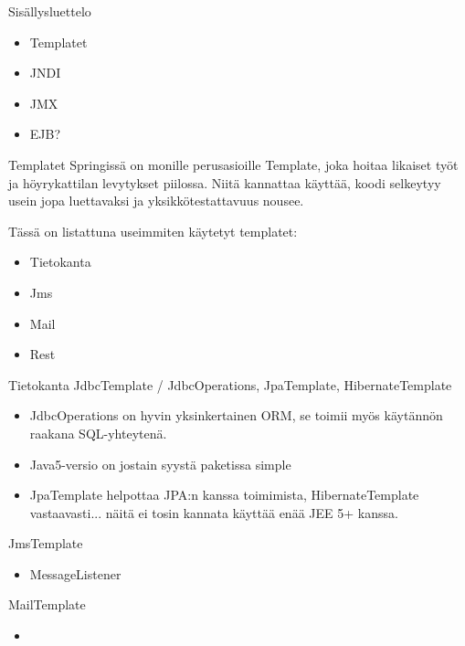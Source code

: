 \documentclass[hyperref={pdfauthor=\AUTHOR},14pt]{beamer}
\author{\AUTHOR}
\title[\TITLE]{\TITLE}
\date{\DATE}
\begin{document}
\begin{frame}[plain]
\titlepage
\end{frame}

\begin{frame}{Sisällysluettelo}
\begin{itemize}
\item Templatet
\item JNDI
\item JMX
\item EJB?
\end{itemize}
\end{frame}

\begin{frame}{Templatet}
Springissä on monille perusasioille Template, joka hoitaa likaiset työt ja höyrykattilan levytykset piilossa. Niitä kannattaa käyttää, koodi selkeytyy usein jopa luettavaksi ja yksikkötestattavuus nousee.

Tässä on listattuna useimmiten käytetyt templatet:
\begin{itemize}
\item Tietokanta
\item Jms
\item Mail
\item Rest
\end{itemize}
\end{frame}

\begin{frame}{Tietokanta}
JdbcTemplate / JdbcOperations,  JpaTemplate, HibernateTemplate
\begin{itemize}
\item JdbcOperations on hyvin yksinkertainen ORM, se toimii myös käytännön raakana SQL-yhteytenä.
\item Java5-versio on jostain syystä paketissa simple
\item JpaTemplate helpottaa JPA:n kanssa toimimista, HibernateTemplate
  vastaavasti... näitä ei tosin kannata käyttää enää JEE 5+ kanssa.
\end{itemize}
\end{frame}

\begin{frame}{JmsTemplate}
\begin{itemize}
\item MessageListener
\end{itemize}
\end{frame}

\begin{frame}{MailTemplate}
\begin{itemize}
\item 
\end{itemize}
\end{frame}
\end{document}
